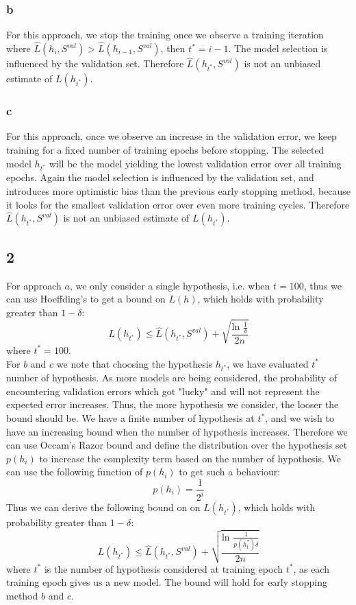 \documentclass{article}
\begin{document}
\subsubsection{b}
For this approach, we stop the training once we observe a training iteration where $\hat{L}(h_{i},S^{val}) > \hat{L}(h_{i-1},S^{val})$, then $t^* = i -1$. The model selection is influenced by the validation set. Therefore $\hat{L}(h_{t^*},S^{val})$ is not an unbiased estimate of $L(h_{t^*})$.
\subsubsection{c}
For this approach, once we observe an increase in the validation error, we keep training for a fixed number of training epochs before stopping. The selected model $h_{t^*}$ will be the model yielding the lowest validation error over all training epochs. Again the model selection is influenced by the validation set, and introduces more optimistic bias than the previous early stopping method, because it looks for the smallest validation error over even more training cycles. Therefore $\hat{L}(h_{t^*},S^{val})$ is not an unbiased estimate of $L(h_{t^*})$.
\subsection{2}
For approach $a$, we only consider a single hypothesis, i.e. when $t=100$, thus we can use Hoeffding's to get a bound on $L(h)$, which holds with probability greater than $1-\delta$:
\begin{equation}
L(h_{t^*}) \leq \hat{L}(h_{t^*},S^{val}) + \sqrt{\dfrac{\text{ln } \frac{1}{\delta}}{2n}}
\end{equation}
where $t^* = 100$. \\
For $b$ and $c$ we note that choosing the hypothesis $h_{t^*}$, we have evaluated $t^*$ number of hypothesis. As more models are being considered, the probability of encountering validation errors which got "lucky" and will not represent the expected error increases. Thus, the more hypothesis we consider, the looser the bound should be. We have a finite number of hypothesis at $t^*$, and we wish to have an increasing bound when the number of hypothesis increases.  Therefore we can use Occam's Razor bound and define the distribution over the hypothesis set $p(h_i)$ to increase the complexity term based on the number of hypothesis. We can use the following function of $p(h_i)$ to get such a behaviour:
\begin{equation}
p(h_i) = \dfrac{1}{2^i}
\end{equation}
Thus we can derive the following bound on
on $L(h_{t^*})$, which holds with probability greater than $1 - \delta$:
\begin{equation}
\label{eq:bound}
L(h_{t^*}) \leq \hat{L}(h_{t^*},S^{val}) + \sqrt{\dfrac{\text{ln } \frac{1}{p(h_t^*) \delta}}{2n}}
\end{equation}
where $t^*$ is the number of hypothesis considered at training epoch $t^*$, as each training epoch gives us a new model. The bound will hold for early stopping method $b$ and $c$.
\end{document}

